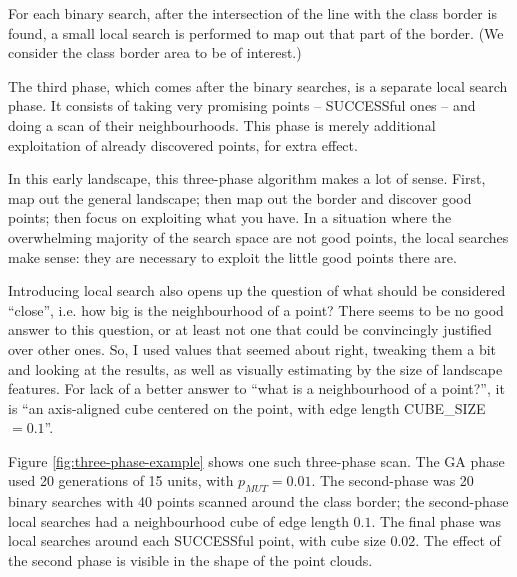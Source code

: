 \documentclass[times, utf8, diplomski]{fer}
\begin{document}
For each binary search, after the intersection of the line with the class border
is found, a small local search is performed to map out that part of the border.
(We consider the class border area to be of interest.)

The third phase, which comes after the binary searches, is a separate local
search phase. It consists of taking very promising points -- SUCCESSful ones --
and doing a scan of their neighbourhoods. This phase is merely additional
exploitation of already discovered points, for extra effect.


In this early landscape, this three-phase algorithm makes a lot of sense.
First, map out the general landscape; then map out the border and discover
good points; then focus on exploiting what you have. In a situation where
the overwhelming majority of the search space are not good points, the
local searches make sense: they are necessary to exploit the little good
points there are.

Introducing local search also opens up the question of what should be considered
``close'', i.e. how big is the neighbourhood of a point? There seems to be no good
answer to this question, or at least not one that could be convincingly justified
over other ones. So, I used values that seemed about right, tweaking them a bit
and looking at the results, as well as visually estimating by the size of
landscape features. For lack of a better answer to ``what is a neighbourhood of
a point?'', it is ``an axis-aligned cube centered on the point, with edge length
CUBE\_SIZE $=0.1$''.

Figure \ref{fig:three-phase-example} shows one such three-phase scan. The GA
phase used 20 generations of 15 units, with $p_{MUT}=0.01$. The second-phase
was 20 binary searches with 40 points scanned around the class border; the
second-phase local searches had a neighbourhood cube of edge length $0.1$.
The final phase was local searches around each SUCCESSful point, with cube
size $0.02$. The effect of the second phase is visible in the shape of the
point clouds.
\end{document}
